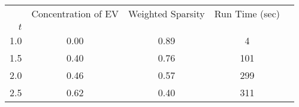 \begin{tabular}{r|cccc}
\toprule
{} &  Concentration of EV &  Weighted Sparsity & Run Time (sec) \\
$t$ &                      &           &                \\
\midrule
1.0 &                 0.00 &      0.89 &              4 \\
1.5 &                 0.40 &      0.76 &            101 \\
2.0 &                 0.46 &      0.57 &            299 \\
2.5 &                 0.62 &      0.40 &            311 \\
\bottomrule
\end{tabular}
